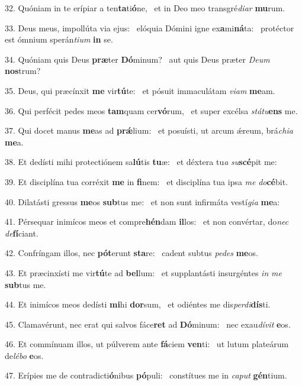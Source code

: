 32. Quóniam in te erípiar a ten\textbf{ta}ti\textbf{ó}ne, \ast\  et in Deo meo transgré\textit{di}\textit{ar} \textbf{mu}rum.\

33. Deus meus, impollúta via ejus: \dag\  elóquia Dómini igne ex\textbf{a}mi\textbf{ná}ta: \ast\  protéctor est ómnium sperán\textit{ti}\textit{um} \textbf{in} se.\

34. Quóniam quis Deus \textbf{præ}ter \textbf{Dó}minum? \ast\  aut quis Deus præter \textit{De}\textit{um} \textbf{nos}trum?\

35. Deus, qui præcínxit \textbf{me} vir\textbf{tú}te: \ast\  et pósuit immaculátam \textit{vi}\textit{am} \textbf{me}am.\

36. Qui perfécit pedes meos \textbf{tam}quam cer\textbf{vó}rum, \ast\  et super excélsa \textit{stá}\textit{tu}\textbf{ens} me.\

37. Qui docet manus \textbf{me}as ad \textbf{prǽ}lium: \ast\  et posuísti, ut arcum ǽreum, brá\textit{chi}\textit{a} \textbf{me}a.\

38. Et dedísti mihi protectiónem sa\textbf{lú}tis \textbf{tu}æ: \ast\  et déxtera tu\textit{a} \textit{su}\textbf{scé}pit me:\

39. Et disciplína tua corréxit \textbf{me} in \textbf{fi}nem: \ast\  et disciplína tua ipsa \textit{me} \textit{do}\textbf{cé}bit.\

40. Dilatásti gressus \textbf{me}os \textbf{sub}tus me: \ast\  et non sunt infirmáta vestí\textit{gi}\textit{a} \textbf{me}a:\

41. Pérsequar inimícos meos et compre\textbf{hén}dam \textbf{il}los: \ast\  et non convértar, do\textit{nec} \textit{de}\textbf{fí}ciant.\

42. Confríngam illos, nec \textbf{pót}erunt \textbf{sta}re: \ast\  cadent subtus \textit{pe}\textit{des} \textbf{me}os.\

43. Et præcinxísti me vir\textbf{tú}te ad \textbf{bel}lum: \ast\  et supplantásti insurgéntes \textit{in} \textit{me} \textbf{sub}tus me.\

44. Et inimícos meos dedísti \textbf{mi}hi \textbf{dor}sum, \ast\  et odiéntes me dis\textit{per}\textit{di}\textbf{dís}ti.\

45. Clamavérunt, nec erat qui salvos fáce\textbf{ret} ad \textbf{Dó}minum: \ast\  nec exau\textit{dí}\textit{vit} \textbf{e}os.\

46. Et commínuam illos, ut púlverem ante \textbf{fá}ciem \textbf{ven}ti: \ast\  ut lutum plateárum de\textit{lé}\textit{bo} \textbf{e}os.\

47. Erípies me de contradicti\textbf{ó}nibus \textbf{pó}puli: \ast\  constítues me in \textit{ca}\textit{put} \textbf{gén}tium.\

